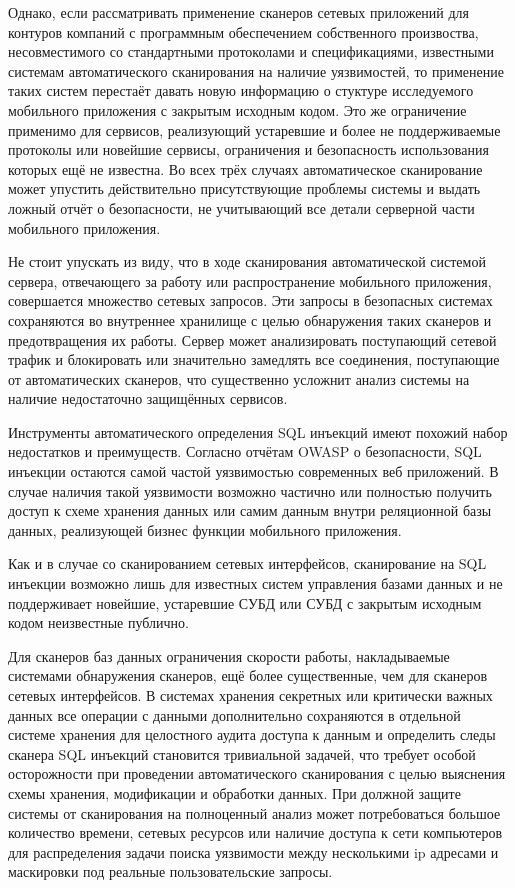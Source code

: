 Однако, если рассматривать применение сканеров сетевых приложений для контуров компаний с программным обеспечением собственного произвоства, несовместимого со стандартными протоколами и спецификациями, известными системам автоматического сканирования на наличие уязвимостей, то применение таких систем перестаёт давать новую информацию о стуктуре исследуемого мобильного приложения с закрытым исходным кодом. Это же ограничение применимо для сервисов, реализующий устаревшие и более не поддерживаемые протоколы или новейшие сервисы, ограничения и безопасность использования которых ещё не известна. Во всех трёх случаях автоматическое сканирование может упустить действительно присутствующие проблемы системы и выдать ложный отчёт о безопасности, не учитывающий все детали серверной части мобильного приложения.

Не стоит упускать из виду, что в ходе сканирования автоматической системой сервера, отвечающего за работу или распространение мобильного приложения, совершается множество сетевых запросов. Эти запросы в безопасных системах сохраняются во внутреннее хранилище с целью обнаружения таких сканеров и предотвращения их работы. Сервер может анализировать поступающий сетевой трафик и блокировать или значительно замедлять все соединения, поступающие от автоматических сканеров, что существенно усложнит анализ системы на наличие недостаточно защищённых сервисов.

Инструменты автоматического определения SQL инъекций имеют похожий набор недостатков и преимуществ. Согласно отчётам OWASP о безопасности, SQL инъекции остаются самой частой уязвимостью современных веб приложений. В случае наличия такой уязвимости возможно частично или полностью получить доступ к схеме хранения данных или самим данным внутри реляционной базы данных, реализующей бизнес функции мобильного приложения.

Как и в случае со сканированием сетевых интерфейсов, сканирование на SQL инъекции возможно лишь для известных систем управления базами данных и не поддерживает новейшие, устаревшие СУБД или СУБД с закрытым исходным кодом неизвестные публично.

Для сканеров баз данных ограничения скорости работы, накладываемые системами обнаружения сканеров, ещё более существенные, чем для сканеров сетевых интерфейсов. В системах хранения секретных или критически важных данных все операции с данными дополнительно сохраняются в отдельной системе хранения для целостного аудита доступа к данным и определить следы сканера SQL инъекций становится тривиальной задачей, что требует особой осторожности при проведении автоматического сканирования с целью выяснения схемы хранения, модификации и обработки данных. При должной защите системы от сканирования на полноценный анализ может потребоваться большое количество времени, сетевых ресурсов или наличие доступа к сети компьютеров для распределения задачи поиска уязвимости между несколькими ip адресами и маскировки под реальные пользовательские запросы.

